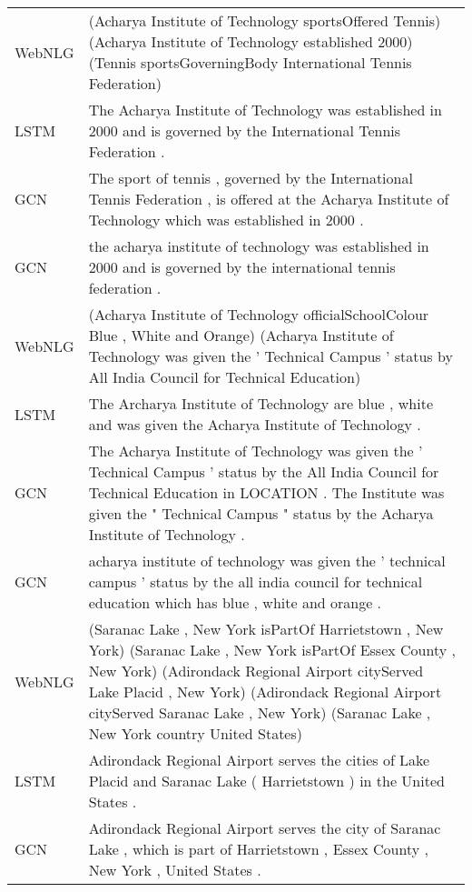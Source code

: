 \documentclass[11pt,a4paper,dvipsnames]{article}
\begin{document}
\begin{table*}[t]
\begin{small}
 \begin{tabular}{|@{~}p{1.0cm}p{14.5cm}@{~}|}
  \hline
WebNLG &  (Acharya Institute of Technology sportsOffered Tennis) (Acharya Institute of Technology established 2000) (Tennis sportsGoverningBody International Tennis Federation)\\  
  LSTM & The Acharya Institute of Technology was established in 2000 and is governed by the International Tennis Federation .\\
  GCN &  The sport of tennis , governed by the International Tennis Federation , is offered at the Acharya Institute of Technology which was established in 2000 .\\
  GCN & the acharya institute of technology was established in 2000 and is governed by the international tennis federation .\\  
  \hline
WebNLG & (Acharya Institute of Technology officialSchoolColour Blue , White and Orange) (Acharya Institute of Technology was given the ' Technical Campus ' status by All India Council for Technical Education)\\
  LSTM & The Archarya Institute of Technology are blue , white and was given the Acharya Institute of Technology .\\
  GCN & The Acharya Institute of Technology was given the ' Technical Campus ' status by the All India Council for Technical Education in LOCATION . The Institute was given the " Technical Campus " status by the Acharya Institute of Technology .\\
  GCN & acharya institute of technology was given the ' technical campus ' status by the all india council for technical education which has blue , white and orange .\\
  \hline
WebNLG &  (Saranac Lake , New York isPartOf Harrietstown , New York) (Saranac Lake , New York isPartOf Essex County , New York) (Adirondack Regional Airport cityServed Lake Placid , New York) (Adirondack Regional Airport cityServed Saranac Lake , New York)  (Saranac Lake , New York country United States)\\  
  LSTM & Adirondack Regional Airport serves the cities of Lake Placid and Saranac Lake ( Harrietstown ) in the United States . \\ 
  GCN & Adirondack Regional Airport serves the city of Saranac Lake , which is part of Harrietstown , Essex County , New York , United States . \\  

\end{tabular}
\end{small}
\end{table*}
\end{document}
